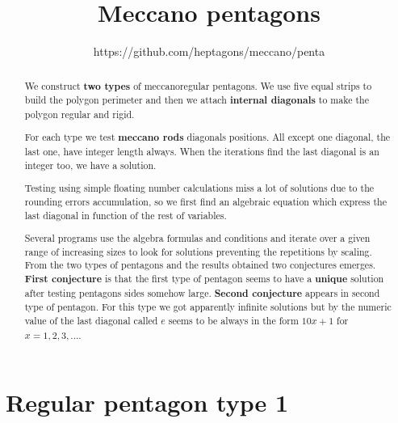 \documentclass[11pt]{article}
\title{\textbf{Meccano pentagons}}
\author{https://github.com/heptagons/meccano/penta}
\date{}
\begin{document}
\maketitle
\begin{abstract}
We construct \textbf{two types} of meccano\meccanoref regular pentagons.
We use five equal strips to build the polygon perimeter and then we attach \textbf{internal diagonals} to make the polygon regular and rigid.

For each type we test \textbf{meccano rods} diagonals positions.
All except one diagonal, the last one, have integer length always.
When the iterations find the last diagonal is an integer too, we have a solution.

Testing using simple floating number calculations miss a lot of solutions due to the rounding errors accumulation, so we first find an algebraic equation which express the last diagonal in function of the rest of variables.

Several programs use the algebra formulas and conditions and iterate over a given range of 
increasing sizes to look for solutions preventing the repetitions by scaling.
\newline\newline
From the two types of pentagons and the results obtained two conjectures emerges.
\textbf{First conjecture} is
that the first type of pentagon seems to have a \textbf{unique} solution after testing
pentagons sides somehow large.
\newline\newline
\textbf{Second conjecture} appears in second type of pentagon. For this type we got apparently
infinite solutions but by the numeric value of the last diagonal called $e$ seems to be always in the form \textbf{$10x + 1$} for $x = 1,2,3,...$.
\end{abstract}

\section{Regular pentagon type 1}
\end{document}
